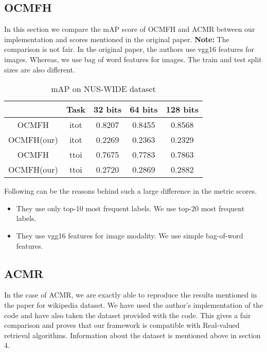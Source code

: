 \subsection{OCMFH}
In this section we compare the mAP score of OCMFH\cite{ocmfh} and ACMR\cite{acmr} between our implementation and scores mentioned in the original paper. \textbf{Note:} The comparison is not fair. In the original paper, the authors use vgg16 features for images. Whereas, we use bag of word features for images. The train and test split sizes are also different.

\begin{table}[!h]
    \centering
    \begin{tabular}{ | c | c | c | c | c |}
        \hline
         & Task & 32 bits & 64 bits & 128 bits
         \\ \hline
         OCMFH\cite{ocmfh} & itot & 0.8207 & 0.8455 & 0.8568
         \\ \hline
         OCMFH(our) & itot & 0.2269 & 0.2363 & 0.2329
         \\ \hline
         OCMFH\cite{ocmfh} & ttoi & 0.7675 & 0.7783 & 0.7863
         \\ \hline
         OCMFH(our) & ttoi & 0.2720 & 0.2869 & 0.2882
         \\ \hline
    \end{tabular}
    \caption{mAP on NUS-WIDE dataset}
    \label{table:}
\end{table}

\par Following can be the reasons behind such a large difference in the metric scores.
    \begin{itemize}
        \item They use only top-10 most frequent labels. We use top-20 most frequent labels.
        \item They use vgg16 features for image modality. We use simple bag-of-word features.
    \end{itemize}

\subsection{ACMR}
In the case of ACMR\cite{acmr}, we are exactly able to reproduce the results mentioned in the paper for wikipedia dataset. We have used the author's implementation of the code and have also taken the dataset provided with the code. This gives a fair comparison and proves that our framework is compatible with Real-valued retrieval algorithms. Information about the dataset is mentioned above in section 4.

